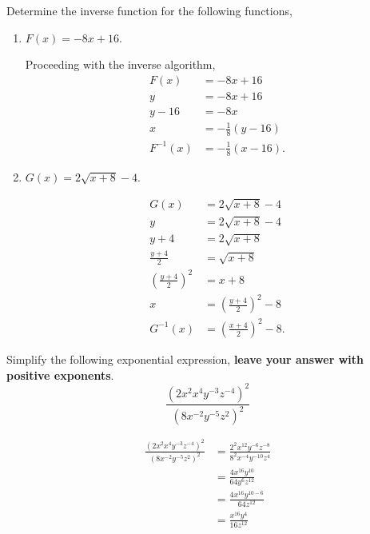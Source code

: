 \documentclass[12pt]{article} %
\begin{document}
\newpage

\begin{qstn}
  Determine the inverse function for the following functions,
  \begin{enumerate}[label=(\alph*)]
    \item $F(x) = -8x + 16$.
      \begin{solution}
        Proceeding with the inverse algorithm,
        \begin{align*}
          F(x) &= -8x + 16\\
          y &= -8x + 16\\
          y - 16 &= -8x\\
          x &= -\frac{1}{8}\left( y - 16 \right)\\
          F^{-1}(x) &= -\frac{1}{8}\left( x - 16 \right)
        .\end{align*}
      \end{solution}

        \vspace*{1cm}

    \item $G(x) = 2\sqrt{x + 8} - 4$.
      \begin{solution}
        \begin{align*}
          G(x) &= 2\sqrt{x + 8}  - 4\\
          y &= 2\sqrt{x + 8}  - 4\\
          y + 4 &= 2\sqrt{x + 8}\\
          \frac{y + 4}{2} &= \sqrt{x + 8}\\
          \left( \frac{y + 4}{2} \right) ^2 &= x + 8\\
          x &= \left( \frac{y + 4}{2} \right) ^2 - 8\\
          G^{-1}(x) &= \left( \frac{x + 4}{2} \right) ^2 - 8
        .\end{align*}
      \end{solution}
  \end{enumerate}
\end{qstn}

\newpage
\begin{qstn}
Simplify the following exponential expression, \textbf{leave your answer with positive exponents}.
\[
   \frac{\left(2x^2x^4y^{-3}z^{-4} \right)^{2}}{\left(8x^{-2}y^{-5}z^{2} \right)^{2}}
\] 

  \begin{solution}
    \begin{align*}
          \frac{\left(2x^2x^4y^{-3}z^{-4} \right)^{2}}{\left(8x^{-2}y^{-5}z^{2} \right)^{2}} 
          &= \frac{2^{2}x^{12}y^{-6}z^{-8} }{8^{2}x^{-4}y^{-10}z^{4} }\\
          &= \frac{4x^{16}y^{10}}{64y^{6}z^{12}}\\
          &= \frac{4x^{16}y^{10-6}}{64z^{12}}\\
          &= \frac{x^{16}y^{4}}{16z^{12}}\\
    \end{align*}
  \end{solution}

\end{qstn}
        \vspace*{1.5cm}
\end{document}
